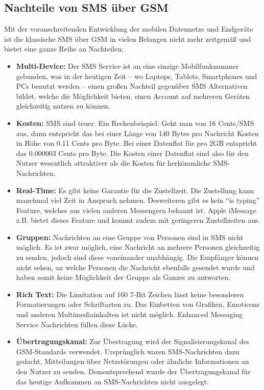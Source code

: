 \documentclass[german,12pt,a4paper]{article}
\begin{document}
\subsection{Nachteile von SMS über GSM}
Mit der voranschreitenden Entwicklung der mobilen Datennetze und Endgeräte ist die klassische SMS über GSM  in vielen Belangen
nicht mehr zeitgemäß und bietet eine ganze Reihe an Nachteilen:
\begin{itemize}
	\item \textbf{Multi-Device:} Der SMS Service ist an eine einzige Mobilfunknummer gebunden, was in der heutigen Zeit -- 
		wo Laptops, Tablets, Smartphones und PCs benutzt werden -- einen großen Nachteil gegenüber SMS Alternativen 
		bildet, welche die Möglichkeit bieten, einen Account auf mehreren Geräten gleichzeitig nutzen zu können.
	\item \textbf{Kosten:} SMS sind teuer. Ein Rechenbeispiel: Geht man von 16 Cents/SMS aus, dann entspricht das bei einer Länge von 
        140 Bytes pro Nachricht Kosten in Höhe von 0.11 Cents pro Byte. Bei einer Datenflat für  pro 2GB entspricht das 
        0.000003 Cents pro Byte. Die Kosten einer Datenflat sind also für den Nutzer wesentlich attraktiver als die Kosten für 
        herkömmliche SMS-Nachrichten.
	\item \textbf{Real-Time:} Es gibt keine Garantie für die Zustellzeit. Die Zustellung kann manchmal viel Zeit in Anspruch nehmen. 
		Desweiteren gibt es kein ``is typing'' Feature, welches aus vielen anderen Messengern bekannt ist. Apple iMessage z.B. bietet 
		dieses Feature und kommt zudem mit geringeren Zustellzeiten aus.
	\item \textbf{Gruppen:} Nachrichten an eine Gruppe von Personen sind in SMS nicht möglich. Es ist zwar möglich, eine Nachricht 
        an mehrere Personen gleichzeitig zu senden, jedoch sind diese voneinander unabhängig. Die Empfänger können nicht sehen, 
        an welche Personen die Nachricht ebenfalls gesendet wurde und haben somit keine Möglichkeit der Gruppe als Ganzes zu antworten.
	\item \textbf{Rich Text:} Die Limitation auf 160 7-Bit Zeichen lässt keine besonderen Formatierungen oder Schriftarten zu. 
        Das Einbetten von Grafiken, Emoticons und anderen Multimediainhalten ist nicht möglich. Enhanced Messaging Service Nachrichten 
        füllen diese Lücke.
	\item \textbf{Übertragungskanal:} Zur Übertragung wird der Signalisierungskanal des GSM-Standards verwendet. Ursprünglich waren 
        SMS-Nachrichten dazu gedacht, Mitteilungen über Netzstörungen oder ähnliche Informationen an den Nutzer zu senden. Dementsprechend 
        wurde der Übertragungskanal für das heutige Aufkommen an SMS-Nachrichten nicht ausgelegt.
\end{itemize}
\end{document}
